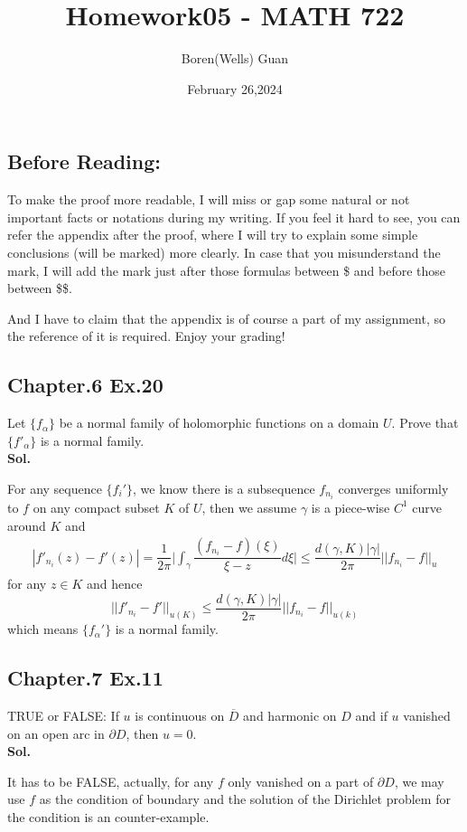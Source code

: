 \documentclass[lang=en,11pt,a4paper,citestyle =authoryear]{elegantpaper}
\title{Homework05 - MATH 722}
\author{Boren(Wells) Guan}
\date{February 26,2024}
\begin{document}
\maketitle

\subsection*{Before Reading:}\par
To make the proof more readable, I will miss or gap some natural or not important facts or notations during my writing. If you feel it hard to see, you can refer the appendix after the proof, where I will try to explain some simple conclusions (will be marked) more clearly. In case that you misunderstand the mark, I will add the mark just after those formulas between \$ and before those between \$\$.\par
And I have to claim that the appendix is of course a part of my assignment, so the reference of it is required. Enjoy your grading!

\subsection*{Chapter.6 Ex.20} 
Let $\{f_{\alpha}\}$ be a normal family of holomorphic functions on a domain $U$. Prove that $\{f'_{\alpha}\}$ is a normal family.
\vspace{0.5em}\\
\textbf{Sol.} \par
For any sequence $\{f_i'\}$, we know there is a subsequence $f_{n_i}$ converges uniformly to $f$ on any compact subset $K$ of $U$, then we assume $\gamma$ is a piece-wise $C^1$ curve around $K$ and
\[
\begin{aligned}
|f'_{n_i}(z) - f'(z)| = \dfrac{1}{2\pi}\Big|\int_{\gamma}\dfrac{(f_{n_i}-f)(\xi)}{\xi-z}d\xi\Big| \leq \dfrac{d(\gamma,K)|\gamma|}{2\pi}||f_{n_i}-f||_u
\end{aligned}
\]
for any $z\in K$ and hence
\[
||f'_{n_i}-f'||_{u(K)} \leq \dfrac{d(\gamma,K)|\gamma|}{2\pi}||f_{n_i}-f||_{u(k)}
\]
which means $\{f_{\alpha}'\}$ is a normal family.
\vspace{0.5em}

\subsection*{Chapter.7 Ex.11} 
TRUE or FALSE: If $u$ is continuous on $\overline{D}$ and harmonic on $D$ and if $u$ vanished on an open arc in $\partial D$, then $u = 0$.
\vspace{0.5em}\\
\textbf{Sol.} \par
It has to be FALSE, actually, for any $f$ only vanished on a part of $\partial D$, we may use $f$ as the condition of boundary and the solution of the Dirichlet problem for the condition is an counter-example.
\vspace{0.5em}
\end{document}
